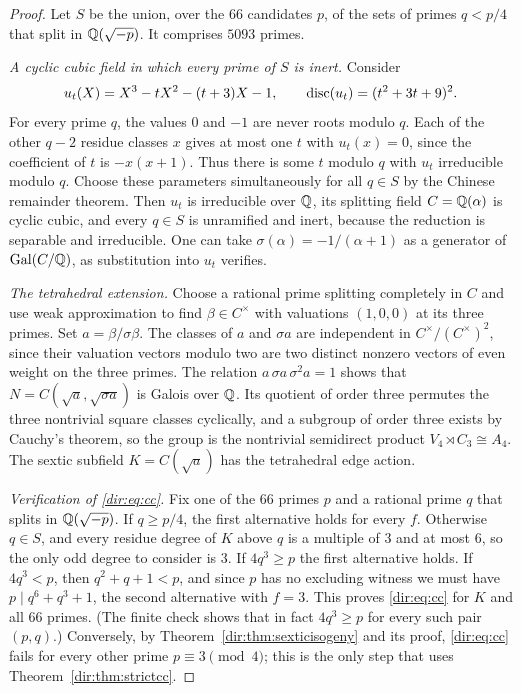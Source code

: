 \begin{proof}
Let $S$ be the union, over the $66$ candidates $p$, of the sets of primes $q<p/4$ that
split in $\mathbb{Q}(\sqrt{-p})$. It comprises $5093$ primes.

\emph{A cyclic cubic field in which every prime of $S$ is inert.} Consider
\[
 u_t(X)=X^3-tX^2-(t+3)X-1,\qquad\operatorname{disc}(u_t)=(t^2+3t+9)^2 .
\]
For every prime $q$, the values $0$ and $-1$ are never roots modulo $q$. Each of the
other $q-2$ residue classes $x$ gives at most one $t$ with $u_t(x)=0$, since the
coefficient of $t$ is $-x(x+1)$. Thus there is some $t$ modulo $q$ with $u_t$
irreducible modulo $q$. Choose these parameters simultaneously for all $q\in S$ by the
Chinese remainder theorem. Then $u_t$ is irreducible over $\mathbb{Q}$, its splitting field
$C=\mathbb{Q}(\alpha)$ is cyclic cubic, and every $q\in S$ is unramified and inert, because the
reduction is separable and irreducible. One can take $\sigma(\alpha)=-1/(\alpha+1)$ as
a generator of $\operatorname{Gal}(C/\mathbb{Q})$, as substitution into $u_t$ verifies.

\emph{The tetrahedral extension.} Choose a rational prime splitting completely in $C$
and use weak approximation to find $\beta\in C^\times$ with valuations $(1,0,0)$ at its
three primes. Set $a=\beta/\sigma\beta$. The classes of $a$ and $\sigma a$ are
independent in $C^\times/(C^\times)^2$, since their valuation vectors modulo two are
two distinct nonzero vectors of even weight on the three primes. The relation
$a\,\sigma a\,\sigma^2a=1$ shows that $N=C(\sqrt a,\sqrt{\sigma a})$ is Galois over
$\mathbb{Q}$. Its quotient of order three permutes the three nontrivial square classes
cyclically, and a subgroup of order three exists by Cauchy's theorem, so the group is
the nontrivial semidirect product $V_4\rtimes C_3\cong A_4$. The sextic subfield
$K=C(\sqrt a)$ has the tetrahedral edge action.

\emph{Verification of \eqref{dir:eq:cc}.} Fix one of the $66$ primes $p$ and a rational
prime $q$ that splits in $\mathbb{Q}(\sqrt{-p})$. If $q\ge p/4$, the first alternative holds
for every $f$. Otherwise $q\in S$, and every residue degree of $K$ above $q$ is a
multiple of $3$ and at most $6$, so the only odd degree to consider is $3$. If
$4q^3\ge p$ the first alternative holds. If $4q^3<p$, then $q^2+q+1<p$, and since $p$
has no excluding witness we must have $p\mid q^6+q^3+1$, the second alternative with
$f=3$. This proves \eqref{dir:eq:cc} for $K$ and all $66$ primes. (The finite check
shows that in fact $4q^3\ge p$ for every such pair $(p,q)$.) Conversely, by
Theorem~\ref{dir:thm:sexticisogeny} and its proof, \eqref{dir:eq:cc} fails for every other
prime $p\equiv3\pmod4$; this is the only step that uses Theorem~\ref{dir:thm:strictcc}.


\end{proof}
